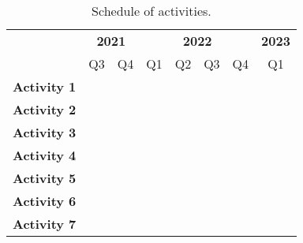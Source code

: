 \begin{table}[hb]
\centering
\caption{Schedule of activities.}
\label{tab:schedule}
\begin{tabular}{c|c|l|c|l|l|l|c|}
\cline{2-8}
 & \multicolumn{2}{c|}{\textbf{2021}} & \multicolumn{4}{c|}{\textbf{2022}} & \textbf{2023} \\ \cline{2-8} 
 & Q3 & \multicolumn{1}{c|}{Q4} & Q1 & \multicolumn{1}{c|}{Q2} & \multicolumn{1}{c|}{Q3} & \multicolumn{1}{c|}{Q4} & Q1 \\ \hline
\multicolumn{1}{|c|}{\textbf{Activity 1}} & \multicolumn{1}{l|}{} & \cellcolor[HTML]{333333} & \multicolumn{1}{l|}{\cellcolor[HTML]{333333}} & \cellcolor[HTML]{333333} & \cellcolor[HTML]{333333} & \cellcolor[HTML]{333333} & \multicolumn{1}{l|}{\cellcolor[HTML]{333333}} \\ \hline
\multicolumn{1}{|c|}{\textbf{Activity 2}} & \cellcolor[HTML]{333333} & \multicolumn{1}{c|}{\cellcolor[HTML]{333333}} &  & \multicolumn{1}{c|}{} & \multicolumn{1}{c|}{} & \multicolumn{1}{c|}{} &  \\ \hline
\multicolumn{1}{|c|}{\textbf{Activity 3}} &  & \multicolumn{1}{c|}{\cellcolor[HTML]{333333}} &  & \multicolumn{1}{c|}{} & \multicolumn{1}{c|}{} & \multicolumn{1}{c|}{} &  \\ \hline
\multicolumn{1}{|c|}{\textbf{Activity 4}} & \multicolumn{1}{l|}{} &  & \multicolumn{1}{l|}{\cellcolor[HTML]{333333}{\color[HTML]{333333} }} &  &  &  & \multicolumn{1}{l|}{} \\ \hline
\multicolumn{1}{|c|}{\textbf{Activity 5}} & \multicolumn{1}{l|}{} &  & \multicolumn{1}{l|}{\cellcolor[HTML]{333333}} & \cellcolor[HTML]{333333} & \cellcolor[HTML]{333333} & \cellcolor[HTML]{333333} & \multicolumn{1}{l|}{} \\ \hline
\multicolumn{1}{|c|}{\textbf{Activity 6}} & \multicolumn{1}{l|}{\cellcolor[HTML]{333333}} & \cellcolor[HTML]{333333} & \multicolumn{1}{l|}{\cellcolor[HTML]{333333}} & \cellcolor[HTML]{333333} & \cellcolor[HTML]{333333} & \cellcolor[HTML]{333333} & \multicolumn{1}{l|}{\cellcolor[HTML]{333333}} \\ \hline
\multicolumn{1}{|c|}{\textbf{Activity 7}} &  & \multicolumn{1}{c|}{} &  & \multicolumn{1}{c|}{} & \multicolumn{1}{c|}{} & \multicolumn{1}{c|}{\cellcolor[HTML]{333333}} & \cellcolor[HTML]{333333} \\ \hline
\end{tabular}
\end{table}